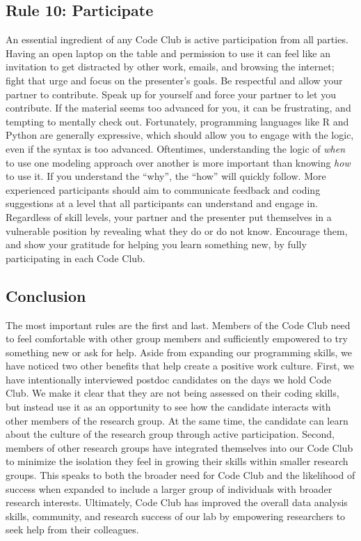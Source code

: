 \documentclass[
  11pt,
]{article}
\begin{document}
\hypertarget{rule-10-participate}{%
\subsection{Rule 10: Participate}\label{rule-10-participate}}

An essential ingredient of any Code Club is active participation from
all parties. Having an open laptop on the table and permission to use it
can feel like an invitation to get distracted by other work, emails, and
browsing the internet; fight that urge and focus on the presenter's
goals. Be respectful and allow your partner to contribute. Speak up for
yourself and force your partner to let you contribute. If the material
seems too advanced for you, it can be frustrating, and tempting to
mentally check out. Fortunately, programming languages like R and Python
are generally expressive, which should allow you to engage with the
logic, even if the syntax is too advanced. Oftentimes, understanding the
logic of \emph{when} to use one modeling approach over another is more
important than knowing \emph{how} to use it. If you understand the
``why'', the ``how'' will quickly follow. More experienced participants
should aim to communicate feedback and coding suggestions at a level
that all participants can understand and engage in. Regardless of skill
levels, your partner and the presenter put themselves in a vulnerable
position by revealing what they do or do not know. Encourage them, and
show your gratitude for helping you learn something new, by fully
participating in each Code Club.

\hypertarget{conclusion}{%
\subsection{Conclusion}\label{conclusion}}

The most important rules are the first and last. Members of the Code
Club need to feel comfortable with other group members and sufficiently
empowered to try something new or ask for help. Aside from expanding our
programming skills, we have noticed two other benefits that help create
a positive work culture. First, we have intentionally interviewed
postdoc candidates on the days we hold Code Club. We make it clear that
they are not being assessed on their coding skills, but instead use it
as an opportunity to see how the candidate interacts with other members
of the research group. At the same time, the candidate can learn about
the culture of the research group through active participation. Second,
members of other research groups have integrated themselves into our
Code Club to minimize the isolation they feel in growing their skills
within smaller research groups. This speaks to both the broader need for
Code Club and the likelihood of success when expanded to include a
larger group of individuals with broader research interests. Ultimately,
Code Club has improved the overall data analysis skills, community, and
research success of our lab by empowering researchers to seek help from
their colleagues.
\end{document}
